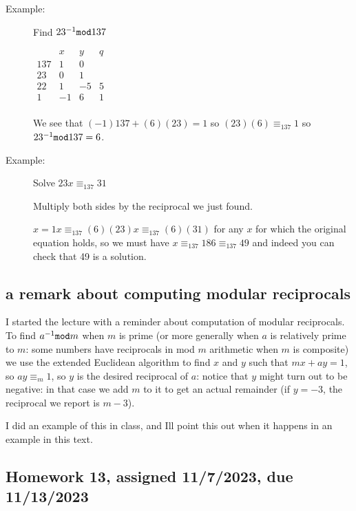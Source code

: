 \documentclass[12pt]{article}
\begin{document}
\begin{description}


\item[Example:]  Find $23^{-1}{\tt mod}137$

$\begin{array}{cccc}
& x& y & q \\ \hline
137 & 1 & 0 & \\

23 & 0 & 1 & \\

22 & 1 & -5 & 5 \\

1 & -1 & 6 & 1 \\

\end{array}$

We see that $(-1)137 + (6)(23) = 1$ so $(23)(6) \equiv_{137} 1$ so $23^{-1} {\tt mod} 137 = 6$.

\item[Example:]  Solve $23x \equiv_{137} 31$

Multiply both sides by the reciprocal we just found.

$x = 1x \equiv_{137} (6)(23)x \equiv_{137} (6)(31)$ for any $x$ for which the original equation holds,
so we must have $x \equiv_{137} 186 \equiv_{137} 49$ and indeed you can check that 49 is a solution.

\end{description}

\subsection{a remark about computing modular reciprocals}

I started the lecture with a reminder about computation of modular reciprocals.  To find $a^{-1}{\tt mod}m$ when $m$ is prime (or more generally when $a$ is relatively prime to $m$:  some numbers have reciprocals in mod $m$ arithmetic when $m$ is composite) we use the extended Euclidean algorithm to find $x$ and $y$ such that $mx + ay = 1$, 
so $ay \equiv_m 1$, so $y$ is the desired reciprocal of $a$:  notice that $y$ might turn out to be negative:  in that case we add $m$ to it to get an actual remainder (if $y = -3$, the reciprocal we report is $m-3$).

I did an example of this in class, and Ill point this out when it happens in an example in this text.

\subsection{Homework 13, assigned 11/7/2023, due 11/13/2023}
\end{document}
